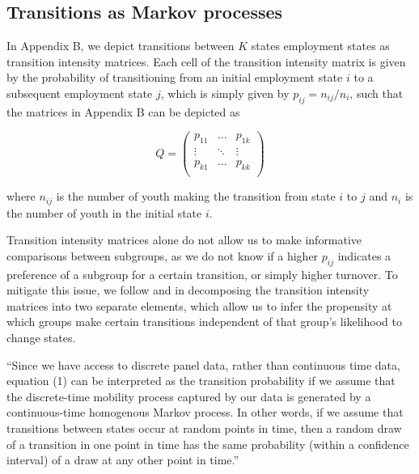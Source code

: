 \documentclass[
  a4paper, twoside, 12pt]{book}
\begin{document}
\newpage

\newpage

\hypertarget{markovapp}{%
\subsection*{Transitions as Markov processes}\label{markovapp}}


In Appendix B, we depict transitions between \(K\) states employment states as transition intensity matrices. Each cell of the transition intensity matrix is given by the probability of transitioning from an initial employment state \(i\) to a subsequent employment state \(j\), which is simply given by \(p_{ij} = n_{ij}/n_i\), such that the matrices in Appendix B can be depicted as

\begin{singlespacing}
$$
Q= \begin{pmatrix}
p_{11} & \dots & p_{1k}\\
\vdots & \ddots & \vdots \\
p_{k1} &\dots & p_{kk} \\
\end{pmatrix}
$$
\end{singlespacing}

where \(n_{ij}\) is the number of youth making the transition from state \(i\) to \(j\) and \(n_i\) is the number of youth in the initial state \(i\).

Transition intensity matrices alone do not allow us to make informative comparisons between subgroups, as we do not know if a higher \(p_{ij}\) indicates a preference of a subgroup for a certain transition, or simply higher turnover. To mitigate this issue, we follow \textcite{bosch2007} and \textcite{cunningham2011} in decomposing the transition intensity matrices into two separate elements, which allow us to infer the propensity at which groups make certain transitions independent of that group's likelihood to change states.

``Since we have access to discrete panel data, rather than continuous time data, equation (1) can be interpreted as the transition probability if we assume that the discrete-time mobility process captured by our data is generated by a continuous-time homogenous Markov process. In other words, if we assume that transitions between states occur at random points in time, then a random draw of a transition in one point in time has the same probability (within a confidence interval) of a draw at any other point in time.''
\end{document}
